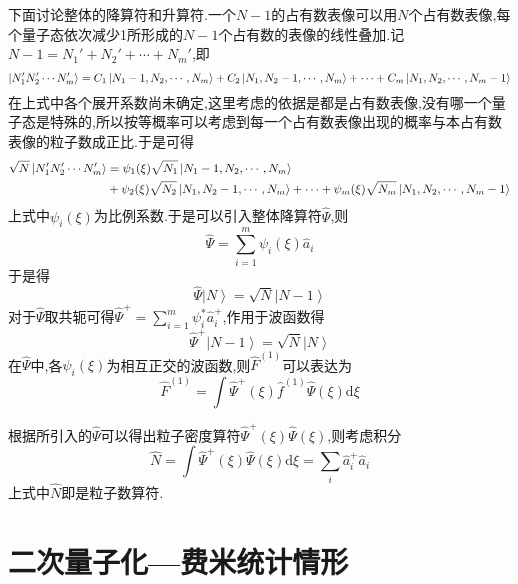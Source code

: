 下面讨论整体的降算符和升算符.一个$N-1$的占有数表像可以用$N$个占有数表像,每个量子态依次减少1所形成的$N-1$个占有数的表像的线性叠加.记$N-1=N_1'+N_2'+\cdots +N_m'$,即
\begin{equation}
  \left|N_1'N_2'\cdots N_m'\right>
  =C_1\left|N_1-1,N_2,\cdots,N_m\right>
  +C_2\left|N_1,N_2-1,\cdots,N_m\right>
  +\cdots
  +C_m\left|N_1,N_2,\cdots,N_m-1\right>
  \notag
\end{equation}
在上式中各个展开系数尚未确定,这里考虑的依据是都是占有数表像,没有哪一个量子态是特殊的,所以按等概率可以考虑到每一个占有数表像出现的概率与本占有数表像的粒子数成正比.于是可得
\begin{align}
  \sqrt{N}\left|N_1'N_2'\cdots N_m'\right>
  &=\psi_1(\xi)\sqrt{N_1}\left|N_1-1,N_2,\cdots,N_m\right>\notag\\
  &+\psi_2(\xi)\sqrt{N_2}\left|N_1,N_2-1,\cdots,N_m\right>
  +\cdots
  +\psi_m(\xi)\sqrt{N_m}\left|N_1,N_2,\cdots,N_m-1\right>
  \notag
\end{align}
上式中$\psi_i(\xi)$为比例系数.于是可以引入整体降算符$\hat{\Psi}$,则
\begin{equation}
  \hat{\Psi}=\sum_{i=1}^m \psi_i(\xi)\hat{a}_i
  \label{eq:totaljiangfu}
\end{equation}
于是得
\begin{equation}
  \hat{\Psi}\left|N\right>=\sqrt{N}\left|N-1\right>
  \label{eq:totaljiangfu0}
\end{equation}
对于$\hat{\Psi}$取共轭可得$\hat{\Psi}^+=\sum_{i=1}^m \psi_i^*\hat{a}_i^+$,作用于波函数得
\begin{equation}
  \hat{\Psi}^+\left|N-1\right>=\sqrt{N}\left|N\right>
  \label{eq:totaljiangfu1}
\end{equation}
在$\hat{\Psi}$中,各$\psi_i(\xi)$为相互正交的波函数,则$\hat{F}^{(1)}$可以表达为
\begin{equation}
  \hat{F}^{(1)}=\int \hat{\Psi}^+(\xi) \hat{f}^{(1)}\hat{\Psi}(\xi)\mathrm{d}\xi
  \label{eq:totaljiangfu2}
\end{equation}

根据所引入的$\hat{\Psi}$可以得出粒子密度算符$\hat{\Psi}^+(\xi)\hat{\Psi}(\xi)$,则考虑积分
\begin{equation}
  \hat{N}=\int \hat{\Psi}^+(\xi)\hat{\Psi}(\xi)\mathrm{d}\xi=\sum_i \hat{a}^+_i\hat{a}_i
  \label{eq:totaljiangfu3}
\end{equation}
上式中$\hat{N}$即是粒子数算符.

\section{二次量子化---费米统计情形}

